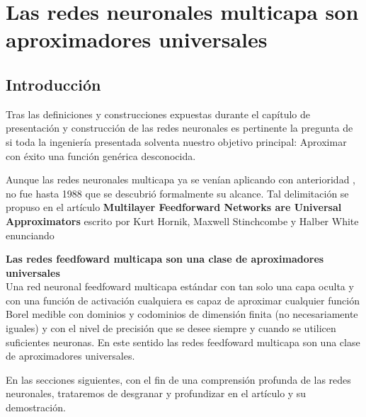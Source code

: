 %

\chapter{Las redes neuronales multicapa son aproximadores universales}  

\section{Introducción}  

Tras las definiciones y construcciones expuestas durante el capítulo de presentación 
y construcción de las redes neuronales 
es pertinente la pregunta de si toda la ingeniería presentada solventa nuestro objetivo principal: Aproximar
con éxito una función genérica desconocida.   

Aunque las redes neuronales multicapa ya se venían aplicando con anterioridad \cite{4307059}, 
no fue hasta 1988 que se descubrió formalmente su alcance.
 Tal delimitación se propuso en el artículo \cite{HORNIK1989359}
\textbf{Multilayer Feedforward Networks are Universal Approximators}
 escrito por Kurt Hornik, Maxwell Stinchcombe y Halber White enunciando 

\begin{teorema}\textbf{Las redes feedfoward multicapa son una clase de aproximadores universales } \label{teo:MFNAUA}
    \\
    Una red neuronal feedfoward multicapa estándar con tan solo una capa oculta y con una función de activación cualquiera es capaz de aproximar cualquier 
    función Borel medible  con dominios y codominios de dimensión finita (no necesariamente iguales) y con el nivel de precisión que se desee siempre y cuando 
    se utilicen suficientes neuronas. En este sentido las redes feedfoward multicapa son una clase de aproximadores universales.

\end{teorema}

En las secciones siguientes, con el fin de una comprensión profunda de las redes neuronales, trataremos de desgranar y profundizar en el artículo y su demostración. 

